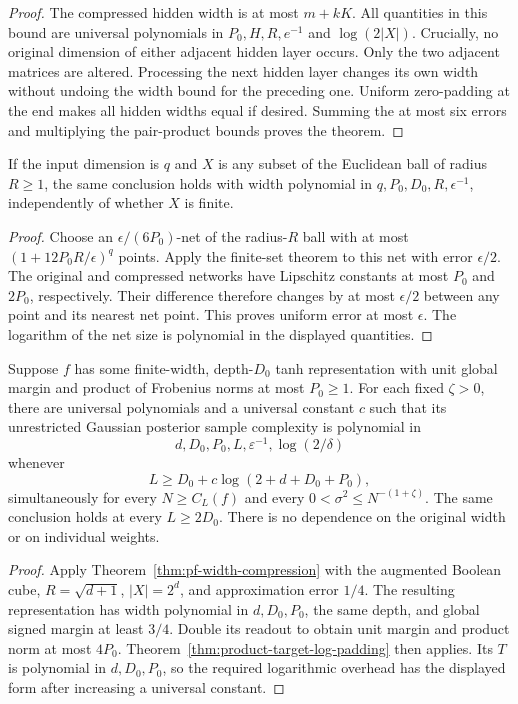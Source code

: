 \begin{proof}
The compressed hidden width is at most $m+kK$. All quantities in this
bound are universal polynomials in $P_0,H,R,e^{-1}$ and
$\log(2|X|)$. Crucially, no original dimension of either adjacent hidden
layer occurs. Only the two adjacent matrices are altered. Processing
the next hidden layer changes its own width without undoing the width
bound for the preceding one. Uniform zero-padding at the end makes
all hidden widths equal if desired. Summing the at most six errors and
multiplying the pair-product bounds proves the theorem.
\end{proof}

\begin{corollary}
\label{cor:pf-compact-compression}
If the input dimension is $q$ and $X$ is any subset of the Euclidean
ball of radius $R\ge1$, the same conclusion holds with width polynomial
in $q,P_0,D_0,R,\epsilon^{-1}$, independently of whether $X$ is finite.
\end{corollary}

\begin{proof}
Choose an $\epsilon/(6P_0)$-net of the radius-$R$ ball with at most
$(1+12P_0R/\epsilon)^q$ points. Apply the finite-set theorem to this net
with error $\epsilon/2$. The original and compressed networks have
Lipschitz constants at most $P_0$ and $2P_0$, respectively. Their
difference therefore changes by at most $\epsilon/2$ between any point
and its nearest net point. This proves uniform error at most $\epsilon$.
The logarithm of the net size is polynomial in the displayed quantities.
\end{proof}

\begin{corollary}
\label{cor:width-free-pf-sufficiency}
Suppose $f$ has some finite-width, depth-$D_0$ tanh representation with
unit global margin and product of Frobenius norms at most $P_0\ge1$.
For each fixed $\zeta>0$, there are universal polynomials and a universal
constant $c$ such that its unrestricted Gaussian posterior sample
complexity is polynomial in
\[
 d,D_0,P_0,L,\varepsilon^{-1},\log(2/\delta)
\]
whenever
\[
 L\ge D_0+c\log(2+d+D_0+P_0),
\]
simultaneously for every $N\ge C_L(f)$ and every
$0<\sigma^2\le N^{-(1+\zeta)}$.
The same conclusion holds at every $L\ge2D_0$.
There is no dependence on the original width or on individual weights.
\end{corollary}

\begin{proof}
Apply Theorem~\ref{thm:pf-width-compression} with the augmented Boolean
cube, $R=\sqrt{d+1}$, $|X|=2^d$, and approximation error $1/4$.
The resulting representation has width polynomial in $d,D_0,P_0$,
the same depth, and global signed margin at least $3/4$.
Double its readout to obtain unit margin and product norm at most
$4P_0$. Theorem~\ref{thm:product-target-log-padding} then applies.
Its $T$ is polynomial in $d,D_0,P_0$, so the required logarithmic
overhead has the displayed form after increasing a universal constant.
\end{proof}

